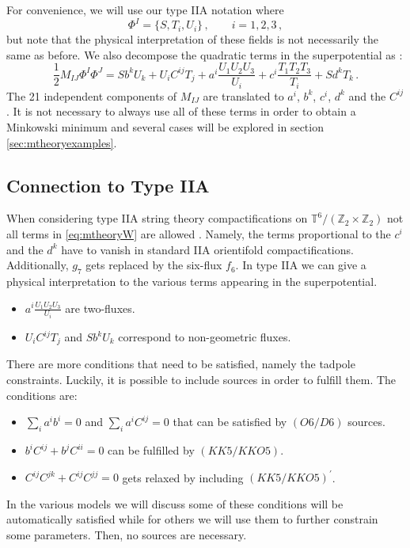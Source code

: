 \documentclass[12pt]{report}
\newcommand{\be}{\begin{equation}}
\newcommand{\ee}{\end{equation}}
\begin{document}
For convenience, we will use our type IIA notation where
\be 
\Phi^I = \{S,T_i,U_i\}\,,\qquad i=1,2,3\,,
\ee
but note that the physical interpretation of these fields is not necessarily the same as before. We also decompose the quadratic terms in the superpotential as \cite{Derendinger:2014wwa}:
\be 
\label{eq:mtheoryW}
\frac{1}{2} M_{IJ} \Phi^I \Phi^J = S b^k U_k + U_i C^{ij} T_j + a^i \frac{U_1 U_2 U_3}{U_i} + c^i \frac{T_1 T_2 T_3}{T_i} + S d^k T_k\,.
\ee
The 21 independent components of $M_{IJ}$ are translated to $a^i$, $b^k$, $c^i$, $d^k$ and the $C^{ij}$. It is not necessary to always use all of these terms in order to obtain a Minkowski minimum and several cases will be explored in section \ref{sec:mtheoryexamples}. 

\subsection{Connection to Type IIA}
\label{sec:IIAconn}
When considering type IIA string theory compactifications on $\mathbb{T}^6/(\mathbb{Z}_2 \times \mathbb{Z}_2)$ not all terms in \ref{eq:mtheoryW} are allowed \cite{Derendinger:2014wwa,Blaback:2018hdo,Villadoro:2007yq}. Namely, the terms proportional to the $c^i$ and the $d^k$ have to vanish in standard IIA orientifold compactifications. Additionally, $g_7$ gets replaced by the six-flux $f_6$. In type IIA  we can give a physical interpretation to the various terms appearing in the superpotential. 
\begin{itemize}
\item $a^i \frac{U_1 U_2 U_3}{U_i}$ are two-fluxes.
\item $U_i C^{ij} T_j$ and $S b^k U_k$ correspond to non-geometric fluxes.
\end{itemize}
There are more conditions that need to be satisfied, namely the tadpole constraints. Luckily, it is possible to include sources in order to fulfill them. The conditions are:
\begin{itemize}
\item $\sum_i a^i b^i = 0$ and $\sum_i a^i C^{ij} = 0$ that can be satisfied by $(O6/D6)$ sources.
\item $b^i C^{ij} + b^j C^{ii} = 0$ can be fulfilled by $(KK5/KKO5)$.
\item $C^{ij}C^{jk} + C^{ij} C^{jj} = 0$ gets relaxed by including $(KK5/KKO5)^\prime$.
\end{itemize}
In the various models we will discuss some of these conditions will be automatically satisfied while for others we will use them to further constrain some parameters. Then, no sources are necessary. 
\end{document}

